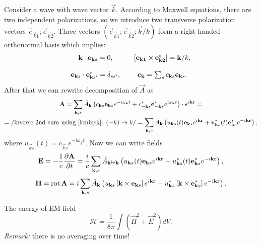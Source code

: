 	Consider a wave with wave vector $\vec{k}$. According to Maxwell equations, there are two independent polarizations, so we introduce two transverse polarization vectors $\vec{e}_{\vec{k}1}; \vec{e}_{\vec{k}2}$. Three vectors $(\vec{e}_{\vec{k}1}; \vec{e}_{\vec{k}2}; \vec{k}/k)$ form a right-handed orthonormal basis which implies:
	\begin{equation}
		\begin{matrix}
			\vec{k} \cdot \vec{e}_{\vec{k}s} = 0, && \vecmult{\vec{e}_{\vec{k}1}}{\vec{e}^*_{\vec{k}2}} = \vec{k}/k, \\ \\
			\vec{e}_{\vec{k}s} \cdot \vec{e}^*_{\vec{k}s'} = \delta_{ss'}, && \vec{c}_{\vec{k}} = \sum_s c_{\vec{k}s} \vec{e}_{\vec{k}s}.
		\end{matrix}
	\end{equation}
	After that we can rewrite decomposition of $\vec{A}$ as
	\begin{multline}
		\vec{A} = \sum_{\vec{k},s} \tilde{A}_{\vec{k}} \left( c_{\vec{k}s} \vec{e}_{\vec{k}s} e^{-i \omega_{\vec{k}} t} + c^*_{-\vec{k}s} \vec{e}^*_{-\vec{k}s}  e^{i \omega_{\vec{k}} t} \right) \cdot e^{i \vec{k} \vec{r}} = \\
		= \left/ \text{inverse 2nd sum using \eqref{kminsk}: } (-k) \to k \right/ =\sum_{\vec{k},s} \tilde{A}_{\vec{k}} \left( u_{\vec{k}s}(t) \vec{e}_{\vec{k}s} e^{i \vec{k} \vec{r}} + u^*_{\vec{k}s}(t) \vec{e}^*_{\vec{k}s}  e^{-i \vec{k} \vec{r}} \right),
	\end{multline}
	where $u_{\vec{k}s}(t) = c_{\vec{k}s} e^{-i \omega_{\vec{k}} t}$. Now we can write fields
	\begin{equation}
		\vec{E} = -\frac{1}{c} \parder{\vec{A}}{t} = \frac{i}{c} \sum_{\vec{k},s} \tilde{A}_{\vec{k}} \omega_{\vec{k}} \left( u_{\vec{k}s}(t) \vec{e}_{\vec{k}s} e^{i \vec{k} \vec{r}} - u^*_{\vec{k}s}(t) \vec{e}^*_{\vec{k}s}  e^{-i \vec{k} \vec{r}} \right),
	\end{equation}
	\begin{equation}
		\vec{H} = \Rot \vec{A} = i \sum_{\vec{k},s} \tilde{A}_{\vec{k}} \left( u_{\vec{k}s} \left[ \vec{k} \times \vec{e}_{\vec{k}s} \right] e^{i \vec{k} \vec{r}} - u^*_{\vec{k}s} \left[ \vec{k} \times \vec{e}^*_{\vec{k}s} \right] e^{-i \vec{k} \vec{r}} \right).
	\end{equation}
	
	The energy of EM field
	\begin{equation}
		\mathscr{H} = \frac{1}{8 \pi} \int \left(\vec{H}^2 + \vec{E}^2 \right) dV.
	\end{equation}
	\textit{Remark:} there is no averaging over time!
	
